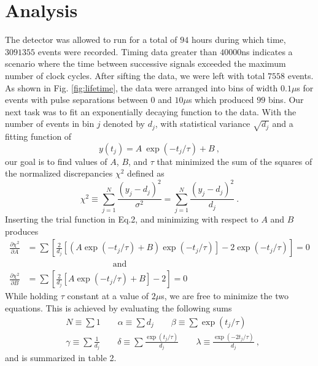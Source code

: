 \documentclass[12pt]{article}
\begin{document}
\section{Analysis}
The detector was allowed to run for a total of $94$ hours during which time, $3091355$ events were recorded. Timing data greater than $40000$ns indicates a scenario where the time between successive signals exceeded the maximum number of clock cycles. After sifting the data, we were left with total $7558$ events. As shown in Fig. \ref{fig:lifetime}, the data were arranged into bins of width $0.1\mu$s for  events with pulse separations between $0$ and $10\mu$s which produced $99$ bins. Our next task was to fit an exponentially decaying function to the data.  With the number of events in bin $j$ denoted by $d_j$, with statistical variance $\sqrt{d_j}$ and a fitting function of
\begin{equation}
y(t_j) = A\:\exp (-t_j/\tau) + B\:,
\end{equation}
our goal is to find values of $A$, $B$, and $\tau$ that minimized the sum of the squares of the normalized discrepancies $\chi^2$ defined as
\begin{equation}
\chi^2 \equiv \sum_{j=1}^N\frac{(y_j - d_j)^2}{\sigma^2} = \sum_{j=1}^N\frac{(y_j - d_j)^2}{d_j}\:.
\end{equation}
Inserting the trial function in Eq.2, and minimizing with respect to $A$ and $B$ produces
\begin{equation}
\begin{split}
\frac{\partial \chi^2}{\partial A} & = \sum \left[ \frac{2}{d_j}[(A\exp (-t_j/\tau) + B)\exp(-t_j/\tau)] -2\exp(-t_j/\tau) \right] = 0
\\
& \qquad\qquad\qquad\qquad\qquad\text{and}
\\
\frac{\partial \chi^2}{\partial B} & = \sum\left[ \frac{2}{d_j}[A\exp(-t_j/\tau) + B] - 2 \right] = 0
\end{split}
\end{equation}
While holding $\tau$ constant at a value of $2\mu$s, we are free to minimize the two equations. This is achieved by evaluating the following sums
\begin{equation}
\begin{split}
& N \equiv \sum 1 \qquad \alpha \equiv \sum d_j \qquad \beta \equiv \sum \exp(t_j/\tau)
\\[2ex]
& \gamma \equiv \sum\frac{1}{d_j} \qquad \delta \equiv \sum\frac{\exp(t_j/\tau)}{d_j} \qquad \lambda \equiv \frac{\exp(-2t_j/\tau)}{d_j}\:,
\end{split}
\end{equation}
and is summarized in table 2.
\end{document}
